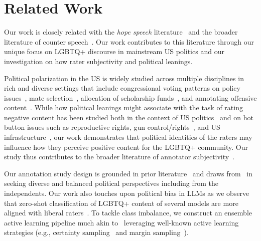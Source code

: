 \section{Related Work}
Our work is closely related with the \textit{hope speech} literature~\cite{palakodety2019hope,palakodety2020voice,chakravarthi-2020-hopeedi} and the broader literature of counter speech~\cite{benesch2014countering,mathew2019thou,DBLP:conf/naacl/HenglePSBA024,DBLP:conf/ijcai/SahaSKM022,DBLP:conf/acl/GuptaDGB0A23}. Our work contributes to this literature through our unique focus on LGBTQ+ discourse in mainstream US politics and our investigation on how rater subjectivity and political leanings. 

Political polarization in the US is widely studied across multiple disciplines in rich and diverse settings that include congressional voting patterns on policy issues~\cite{poole1984polarization}, mate selection~\cite{huber2017political}, allocation of scholarship funds~\cite{iyengar2015fear}, and annotating offensive content~\cite{sap-etal-2022-annotators,Vicarious}. While how political leanings might associate with the task of rating negative content has been studied both in the context of US politics~\cite{sap-etal-2022-annotators,Vicarious} and on hot button issues such as reproductive rights, gun control/rights~\cite{Vicarious}, and US infrastructure~\cite{InfrastructureOmbudsman}, our work demonstrates that political identities of the raters may influence how they perceive positive content for the LGBTQ+ community. Our study thus contributes to the broader literature of annotator subjectivity~\cite{pavlick2019inherent,sap2019risk, al2020identifying, larimore2021reconsidering, sap-etal-2022-annotators, goyal2022your, pei-jurgens-2023-annotator, Vicarious, homan2024intersectionality, prabhakaran2024grasp}. 

Our annotation study design is grounded in prior literature~\cite{sap-etal-2022-annotators,Vicarious} and draws from~\cite{Vicarious} in seeking diverse and balanced political perspectives including from the independents. Our work also touches upon political bias in LLMs as we observe that zero-shot classification of LGBTQ+ content of several models are more aligned with liberal raters~\cite{feng-etal-2023-pretraining,bang-etal-2024-measuring}. To tackle class imbalance, we construct an ensemble active learning pipeline much akin to~\cite{palakodety2020voice} leveraging well-known active learning strategies (e.g., certainty sampling~\cite{sindhwani2009uncertainty} and margin sampling~\cite{scheffer2001active}).  

